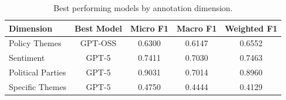 \begin{table}[h!]
\centering
\caption{Best performing models by annotation dimension.}
\label{tab:category_performance}
\begin{tabular}{lcccc}
\toprule
\textbf{Dimension} & \textbf{Best Model} & \textbf{Micro F1} & \textbf{Macro F1} & \textbf{Weighted F1} \\
\midrule
Policy Themes & GPT-OSS & 0.6300 & 0.6147 & 0.6552 \\
Sentiment & GPT-5 & 0.7411 & 0.7030 & 0.7463 \\
Political Parties & GPT-5 & 0.9031 & 0.7014 & 0.8960 \\
Specific Themes & GPT-5 & 0.4750 & 0.4444 & 0.4129 \\
\bottomrule
\end{tabular}
\end{table}